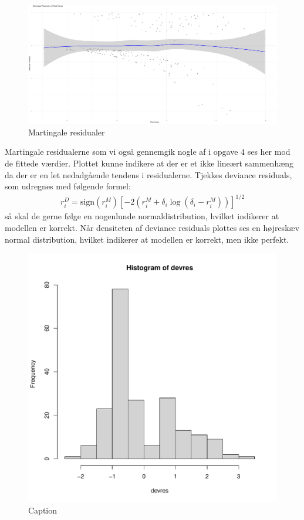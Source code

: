 \newpage
    \begin{figure}[h]
    \centering
    \includegraphics[width=1\linewidth]{Basses_kode/Billeder_duration/martingale_residuals_against_fitted_values.pdf}
    \caption{Martingale residualer}
    \label{fig:enter-label}
\end{figure}
\noindent Martingale residualerne som vi også gennemgik nogle af i opgave 4 ses her mod de fittede værdier. Plottet kunne indikere at der er et ikke lineært sammenhæng da der er en let nedadgående tendens i residualerne.
\pause
Tjekkes deviance residuals, som udregnes med følgende formel: 
\begin{align}
r_i^D = \text{sign}(r_i^M) \left[ -2 \left( r_i^M + \delta_i \log(\delta_i - r_i^M) \right) \right]^{1/2}
\end{align} 
så skal de gerne følge en nogenlunde normaldistribution, hvilket indikerer at modellen er korrekt. Når densiteten af deviance residuals plottes ses en højreskæv normal distribution, hvilket indikerer at modellen er korrekt, men ikke perfekt.
\begin{figure}[h]
    \centering
    \includegraphics[width=0.5\linewidth]{Basses_kode/Billeder_duration/deviance_residuals_Histogram.pdf}
    \caption{Caption}
    \label{fig:enter-label}
\end{figure}
\\\\


